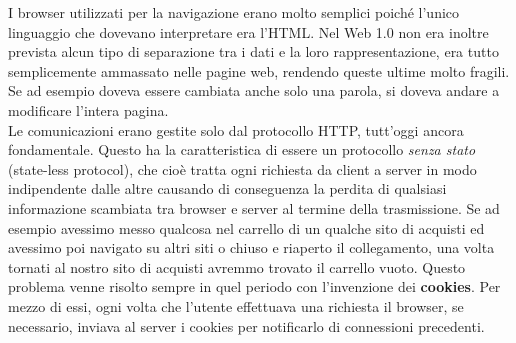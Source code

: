 \documentclass[a4paper, 11pt, oneside]{book}
\theoremstyle{plain}
\begin{document}
\begin{center}
\end{center}
I browser utilizzati per la navigazione erano molto semplici poiché l'unico linguaggio che dovevano interpretare era l'HTML. Nel Web 1.0 non era inoltre prevista alcun tipo di separazione tra i dati e la loro rappresentazione, era tutto semplicemente ammassato nelle pagine web, rendendo queste ultime molto fragili. Se ad esempio doveva essere cambiata anche solo una parola, si doveva andare a modificare l'intera pagina.  \\Le comunicazioni erano gestite solo dal protocollo HTTP, tutt'oggi ancora fondamentale. Questo ha la caratteristica di essere un protocollo\textit{ senza stato} (state-less protocol), che cioè tratta ogni richiesta da client a server in modo indipendente dalle altre causando di conseguenza la perdita di qualsiasi informazione scambiata tra browser e server al termine della trasmissione. Se ad esempio avessimo messo qualcosa nel carrello di un qualche sito di acquisti ed avessimo poi navigato su altri siti o chiuso e riaperto il collegamento, una volta tornati al nostro sito di acquisti avremmo trovato il carrello vuoto. Questo problema venne risolto sempre in quel periodo con l'invenzione dei \textbf{cookies}. Per mezzo di essi, ogni volta che l'utente effettuava una richiesta il browser, se necessario, inviava al server i cookies per notificarlo di connessioni precedenti.\\\\
\end{document}
